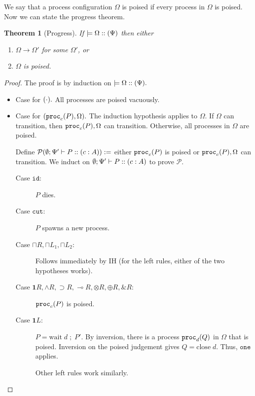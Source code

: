 \documentclass[11pt]{article}
\theoremstyle{plain}
\newtheorem{theorem}{Theorem}[section]
\theoremstyle{definition}
\theoremstyle{remark}
\DeclarePairedDelimiter\parens{(}{)}             %
\newcommand\intersect{\mathbin{\sqcap}}
\newcommand\imp{\supset}
\newcommand\lolli{\multimap}
\newcommand\terminate{\mathbf{1}}
\newcommand\tensor{\otimes}
\newcommand\internal{\oplus}
\newcommand\external{\&}
\newcommand\seq{\;;\;}
\newcommand\tclose[1]{\mathrm{close}\;#1}
\newcommand\twait[2]{\mathrm{wait}\;#1 \seq #2}
\newcommand{\irb}[1]{\texttt{#1}}
\newcommand{\emptyCtx}{\emptyset}
\newcommand{\ctxChan}{\Psi}
\newcommand{\config}{\Omega}
\newcommand\typeProc[3]{#1 :: \parens{#2 : #3}}
\newcommand\typeS[5]{#1; #2 \vdash \typeProc{#3}{#4}{#5}}
\newcommand\stepArrow{\longrightarrow}
\newcommand\steps[2]{#1 \stepArrow #2}
\newcommand\provides[2]{\models #1 :: \parens{#2}}
\newcommand\proc[2]{\irb{proc}_{#1}\parens{#2}}
\newcommand\pred[1]{\mathcal{P}\parens*{#1}}
\begin{document}
We say that a process configuration $\config$ is poised if every process in $\config$ is poised.  Now we can state the progress theorem.

\begin{theorem}[Progress]
If $\provides{\config}{\ctxChan}$ then either
\begin{enumerate}
	\item $\steps{\config}{\config'}$ for some $\config'$, or
	\item $\config$ is poised.
\end{enumerate}
\end{theorem}

\begin{proof}
The proof is by induction on $\provides{\config}{\ctxChan}.$
\begin{itemize}
	\item Case for $\parens{\cdot}.$ All processes are poised vacuously.
	\item Case for $\parens{\proc{c}{P}, \config}.$ The induction hypothesis applies to $\config.$ If $\config$ can transition, then $\proc{c}{P}, \config$ can transition. Otherwise, all processes in $\config$ are poised. 
	
	Define $\pred{\typeS{\emptyCtx}{\ctxChan'}{P}{c}{A}} :=$ either $\proc{c}{P}$ is poised or $\proc{c}{P}, \config$ can transition. We induct on $\typeS{\emptyCtx}{\ctxChan'}{P}{c}{A}$ to prove $\mathcal{P}.$
	\begin{description}
		\item[Case $\irb{id}:$] $P$ dies.
		\item[Case $\irb{cut}:$] $P$ spawns a new process.
		\item[Case $\intersect R, \intersect L_1, \intersect L_2:$] Follows immediately by IH (for the left rules, either of the two hypotheses works).
		\item[Case $\terminate R, \wedge R, \imp R, \lolli R, \tensor R, \internal R, \external R:$] $\proc c P$ is poised.
		\item[Case $\terminate L:$] $P = \twait d {P'}.$ By inversion, there is a process $\proc d Q$ in $\config$ that is poised. Inversion on the poised judgement gives $Q = \tclose d.$ Thus, $\irb{one}$ applies.
		
		\par Other left rules work similarly.
	\end{description}
\end{itemize}
\end{proof}
\end{document}
